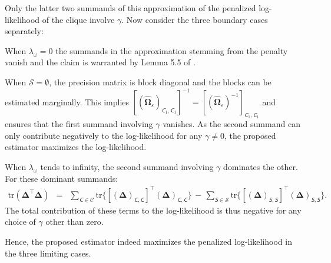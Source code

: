 Only the latter two summands of this approximation of the penalized log-likelihood of the clique involve $\gamma$. Now consider the three boundary cases separately:
\begin{compactitem}
\item When $\lambda_{\omega} = 0$ the summands in the approximation stemming from the penalty vanish and the claim is warranted by Lemma 5.5 of \cite{Lauritzen1996}.

\item When $\mathcal{S} = \emptyset$, the precision matrix is block diagonal and the blocks can be estimated marginally. This implies $[(\widehat{\mathbf{\Omega}}_{\varepsilon})_{\mathsfit{C}_1,\mathsfit{C}_1} ]^{-1} =
[(\widehat{\mathbf{\Omega}}_{\varepsilon})^{-1}]_{\mathsfit{C}_1,\mathsfit{C}_1}$ and ensures that the first summand involving $\gamma$ vanishes. As the second summand can only contribute negatively to the log-likelihood for any $\gamma \not= 0$, the proposed estimator maximizes the log-likelihood.

\item When $\lambda_{\omega}$ tends to infinity, the second summand involving $\gamma$ dominates the other. For these dominant summands:
\begin{eqnarray*}
\mbox{tr}  ( \mathbf{\Delta}^\top \mathbf{\Delta})
& = & \sum_{\mathsfit{C} \in \mathcal{C}} \mbox{tr} \{ [ (\mathbf{\Delta})_{\mathsfit{C},\mathsfit{C}}]^{\top} (\mathbf{\Delta})_{\mathsfit{C},\mathsfit{C}} \}
\, - \, \sum_{\mathsfit{S} \in \mathcal{S}} \mbox{tr} \{ [ (\mathbf{\Delta})_{\mathsfit{S},\mathsfit{S}}]^{\top} (\mathbf{\Delta})_{\mathsfit{S}, \mathsfit{S}} \}.
\end{eqnarray*}
The total contribution of these terms to the log-likelihood is thus negative for any choice of $\gamma$ other than zero.

\end{compactitem}
Hence, the proposed estimator indeed maximizes the penalized log-likelihood in the three limiting cases.

\newpage
